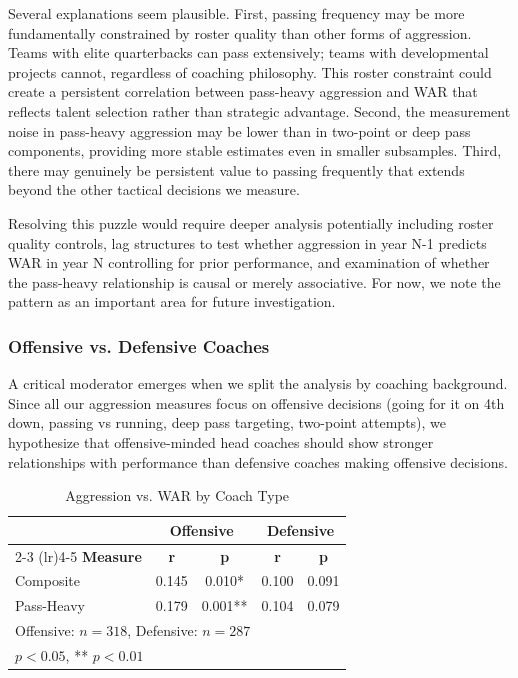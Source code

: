 \documentclass[11pt,twocolumn]{article}
\begin{document}
Several explanations seem plausible. First, passing frequency may be more fundamentally constrained by roster quality than other forms of aggression. Teams with elite quarterbacks can pass extensively; teams with developmental projects cannot, regardless of coaching philosophy. This roster constraint could create a persistent correlation between pass-heavy aggression and WAR that reflects talent selection rather than strategic advantage. Second, the measurement noise in pass-heavy aggression may be lower than in two-point or deep pass components, providing more stable estimates even in smaller subsamples. Third, there may genuinely be persistent value to passing frequently that extends beyond the other tactical decisions we measure.

Resolving this puzzle would require deeper analysis potentially including roster quality controls, lag structures to test whether aggression in year N-1 predicts WAR in year N controlling for prior performance, and examination of whether the pass-heavy relationship is causal or merely associative. For now, we note the pattern as an important area for future investigation.

\subsubsection{Offensive vs. Defensive Coaches}

A critical moderator emerges when we split the analysis by coaching background. Since all our aggression measures focus on offensive decisions (going for it on 4th down, passing vs running, deep pass targeting, two-point attempts), we hypothesize that offensive-minded head coaches should show stronger relationships with performance than defensive coaches making offensive decisions.

\begin{table}[H]
\centering
\caption{Aggression vs. WAR by Coach Type}
\label{tab:type_war}
\scriptsize
\begin{tabular}{lcccc}
\toprule
 & \multicolumn{2}{c}{\textbf{Offensive}} & \multicolumn{2}{c}{\textbf{Defensive}} \\
\cmidrule(lr){2-3} \cmidrule(lr){4-5}
\textbf{Measure} & \textbf{r} & \textbf{p} & \textbf{r} & \textbf{p} \\
\midrule
Composite & 0.145 & 0.010* & 0.100 & 0.091 \\
Pass-Heavy & 0.179 & 0.001** & 0.104 & 0.079 \\
\bottomrule
\multicolumn{5}{l}{\small Offensive: $n=318$, Defensive: $n=287$}\\
\multicolumn{5}{l}{\small * $p<0.05$, ** $p<0.01$}
\end{tabular}
\end{table}
\end{document}
